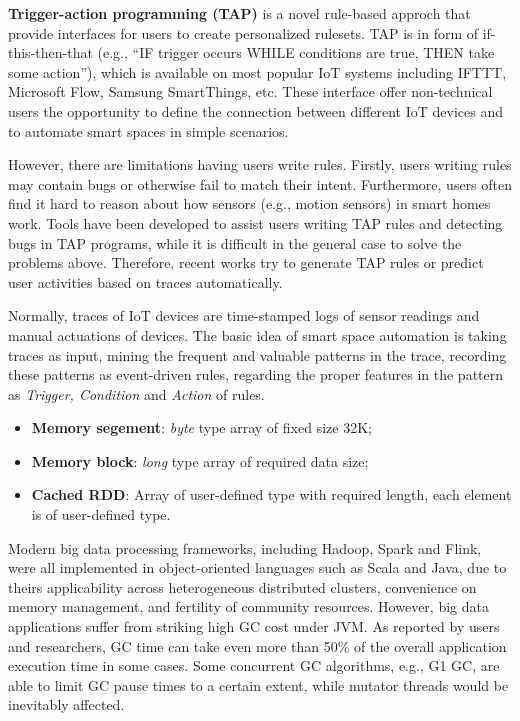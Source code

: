 \documentclass[sigplan, screen]{acmart}
\begin{document}
\textbf{Trigger-action programming (TAP)}\cite{ghiani2017personalization, huang2015supporting, ur2014practical} is a novel rule-based approch 
that provide interfaces for users to create personalized rulesets. TAP is in form of if-this-then-that (e.g., “IF trigger occurs WHILE conditions are true, THEN take
 some action”), which is available on most popular IoT systems including IFTTT\cite{IFTTT}, Microsoft Flow\cite{levy2017microsoft},
  Samsung SmartThings\cite{mossberg2014smartthings}, etc. These interface offer non-technical users the opportunity to define the connection between different IoT 
  devices and to automate smart spaces in simple scenarios. 

However, there are limitations having users write rules. Firstly, users writing rules may contain bugs or otherwise fail to match their intent\cite{mikolov2016roadmap, antonakakis2017understanding}.
Furthermore, users often find it hard to reason about how sensors (e.g., motion sensors) in smart homes work. Tools have been developed to assist users writing TAP rules and 
detecting bugs in TAP programs\cite{luo2020arbee, lien2016soli}, while it is difficult in the general case to solve the problems above. Therefore,
recent works try to generate TAP rules or predict user activities based on traces automatically.

Normally, traces of IoT devices are time-stamped logs of sensor readings and manual actuations of devices. The basic idea of smart space automation 
is taking traces as input, mining the frequent and valuable patterns in the trace, recording these patterns as event-driven rules, regarding the proper features
in the pattern as \emph{Trigger, Condition} and \emph{Action} of rules. 


\begin{itemize}
  \item \textbf{Memory segement}: \emph{byte} type array of fixed size 32K;
  \item \textbf{Memory block}: \emph{long} type array of required data size;
  \item \textbf{Cached RDD}: Array of user-defined type with required length, each element is of user-defined type.
\end{itemize}

Modern big data processing frameworks, including Hadoop\cite{shvachko2010hadoop}, Spark\cite{zaharia2010spark} and
Flink\cite{carbone2015apache}, were all implemented in object-oriented languages such as Scala and Java, due to 
theirs applicability across heterogeneous distributed clusters, convenience on memory management, and fertility 
of community resources. However, big data applications suffer from striking high GC cost under JVM. As reported by users and researchers,
GC time can take even more than 50$\%$ of the overall application execution time in some cases\cite{stackoverflow, bu2013bloat}.
Some concurrent GC algorithms, e.g., G1 GC\cite{detlefs2004garbage}, are able to limit GC pause times to a certain extent, 
while mutator threads would be inevitably affected\cite{xu2019experimental, wu2020platinum}.
\end{document}
